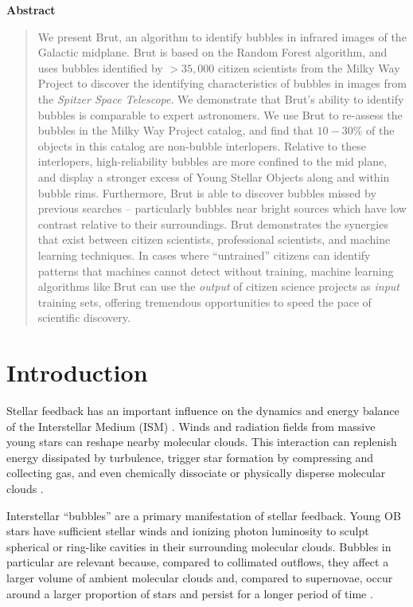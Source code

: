  \begin{center}
  \bfseries Abstract
\end{center}
 \begin{quote}
We present Brut, an algorithm to identify bubbles in infrared images of the Galactic midplane. Brut is based on the Random Forest algorithm, and uses bubbles identified by $>35,000$ citizen scientists from the Milky Way Project to discover the identifying characteristics of bubbles in images from the \textit{Spitzer Space Telescope}. We demonstrate that Brut's ability to identify bubbles is comparable to expert astronomers. We use Brut to re-assess the bubbles in the Milky Way Project catalog, and find that $10-30\%$ of the objects in this catalog are non-bubble interlopers. Relative to these interlopers, high-reliability bubbles are more confined to the mid plane, and display a stronger excess of Young Stellar Objects along and within bubble rims. Furthermore, Brut is able to discover bubbles missed by previous searches -- particularly bubbles near bright sources which have low contrast relative to their surroundings. Brut demonstrates the synergies that exist between citizen scientists, professional scientists, and machine learning techniques. In cases where ``untrained'' citizens can identify patterns that machines cannot detect without training, machine learning algorithms like Brut can use the \emph{output} of citizen science projects as \emph{input} training sets, offering tremendous opportunities to speed the pace of scientific discovery.
\end{quote}

\section{Introduction}
\label{sec:intro}
Stellar feedback has an important influence on the dynamics and energy balance of the Interstellar Medium (ISM) \citep{Zinnecker07}. Winds and radiation fields from massive young stars can reshape nearby molecular clouds. This interaction can replenish energy dissipated by turbulence, trigger star formation by compressing and collecting gas, and even chemically dissociate or physically disperse molecular clouds \citep{Matzner02}.

Interstellar ``bubbles'' are a primary manifestation of stellar feedback. Young OB stars have sufficient stellar winds and ionizing photon luminosity to sculpt spherical or ring-like cavities in their surrounding molecular clouds. Bubbles in particular are relevant because, compared to collimated outflows, they affect a larger volume of ambient molecular clouds and, compared to supernovae, occur around a larger proportion of stars and persist for a longer period of time \citep{Matzner02, Arce11}.

